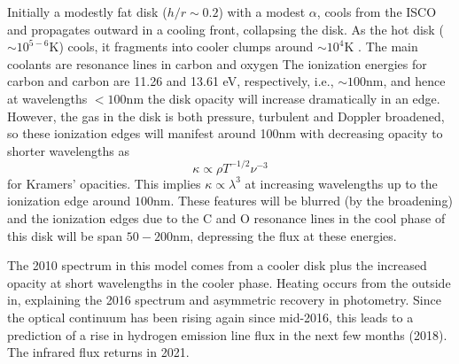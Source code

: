 \documentclass[11pt,a4paper]{article}
\begin{document}
Initially a modestly fat disk ($h/r \sim 0.2$) with a modest $\alpha$,
cools from the ISCO and propagates outward in a cooling front,
collapsing the disk. As the hot disk ($\sim 10^{5-6}$K) cools, it
fragments into cooler clumps around $\sim 10^{4}$K \citep[see e.g.,
][]{McCourt2016}.  The main coolants are resonance lines in carbon and
oxygen \citep[see e.g., Fig. 18 in ][]{Sutherland_Dopita1993} The
ionization energies for carbon and carbon are 11.26 and 13.61 eV,
respectively, i.e., $\sim 100$nm, and hence at wavelengths $<100$nm
the disk opacity will increase dramatically in an edge. %
However, the
gas in the disk is both pressure, turbulent and Doppler broadened, so
these ionization edges will manifest around 100nm with decreasing
opacity to shorter wavelengths as
\begin{equation}
  \kappa \propto \rho T^{-1/2} \nu^{-3}
\end{equation}
for Kramers' opacities. This implies $\kappa \propto \lambda^{3}$
at increasing wavelengths up to the ionization edge around $100$nm.
These features will be blurred (by the broadening) and the ionization
edges due to the C and O resonance lines in the cool phase of this
disk will be span $50-200$nm, depressing the flux at these energies.

The 2010 spectrum in this model comes from a cooler disk plus the
increased opacity at short wavelengths in the cooler phase. Heating
occurs from the outside in, explaining the 2016 spectrum and
asymmetric recovery in photometry.  Since the
optical continuum has been rising again since mid-2016, this leads to
a prediction of a rise in hydrogen emission line flux in the next few
months (2018). The infrared flux returns in 2021. 
\end{document}
